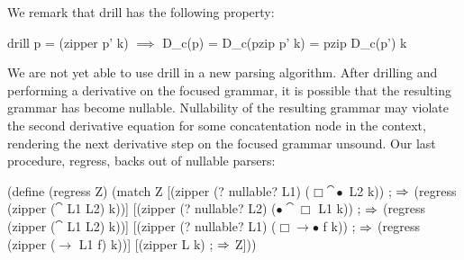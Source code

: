 We remark that drill has the following property:
%
\begin{code}
drill p = (zipper p' k) \(\implies\) 
  D_c(p) = D_c(pzip p' k) = pzip D_c(p') k
\end{code}

We are not yet able to use drill in a new parsing algorithm.
%
After drilling and performing a derivative on the focused grammar, it is
possible that the resulting grammar has become nullable.
%
Nullability of the resulting grammar may violate the second derivative equation
for some concatentation node in the context, rendering the next derivative step
on the focused grammar unsound.
%
Our last procedure, regress, backs out of nullable parsers:
\begin{code}
(define (regress Z)
  (match Z
    [(zipper (? nullable? L1) (\(\Box\cat\bullet\) L2 k))   
     ; \(\mathrel{\Rightarrow}\)
     (regress (zipper (\(\cat\) L1 L2) k))]
    [(zipper (? nullable? L2) (\(\bullet\cat\Box\) L1 k))
     ; \(\mathrel{\Rightarrow}\)
     (regress (zipper (\(\cat\) L1 L2) k))]
    [(zipper (? nullable? L1) (\(\Box\to\bullet\) f k))    
     ; \(\mathrel{\Rightarrow}\)
     (regress (zipper (\(\to\) L1 f) k))]
    [(zipper L k)
     ; \(\mathrel{\Rightarrow}\)
     Z]))
\end{code}

